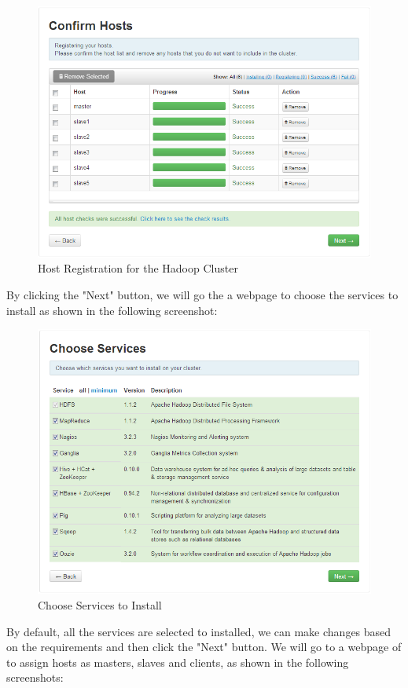 \begin{figure}[ht]
  \centering
  \includegraphics[width=.8\textwidth]{figs/5163os_06_17.png}
  \caption{Host Registration for the Hadoop Cluster}\label{fig:host.registration}
\end{figure} 
By clicking the "Next" button, we will go the a webpage to choose the services to install as shown in the following screenshot:
\begin{figure}[ht]
  \centering
  \includegraphics[width=.8\textwidth]{figs/5163os_06_18.png}
  \caption{Choose Services to Install}\label{fig:choose.services}
\end{figure} 
By default, all the services are selected to installed, we can make changes based on the requirements and then click the "Next" button. We will go to a webpage of to assign hosts as masters, slaves and clients, as shown in the following screenshots:
